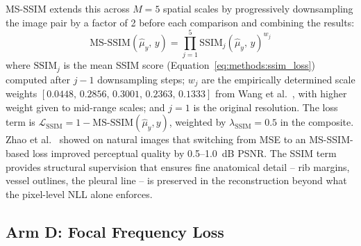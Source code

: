 \documentclass[12pt, a4paper, twoside, openright]{book}
\begin{document}
MS-SSIM \cite{wang_multiscale_2003} extends this across $M = 5$ spatial scales by
progressively downsampling the image pair by a factor of 2 before each comparison and
combining the results:
\begin{equation}
\label{eq:methods:ssim}
\mathrm{MS\text{-}SSIM}\!\left(\hat{\mu}_y,\,y\right)
  = \prod_{j=1}^{5}\mathrm{SSIM}_j\!\left(\hat{\mu}_y,\,y\right)^{w_j}
\end{equation}
where $\mathrm{SSIM}_j$ is the mean SSIM score (Equation~\ref{eq:methods:ssim_loss})
computed after $j-1$ downsampling steps; $w_j$ are the empirically determined scale
weights $[0.0448,\,0.2856,\,0.3001,\,0.2363,\,0.1333]$ from Wang et al.\
\cite{wang_multiscale_2003}, with higher weight given to mid-range scales; and $j = 1$
is the original resolution. The loss term is $\mathcal{L}_{\mathrm{SSIM}} = 1 -
\mathrm{MS\text{-}SSIM}(\hat{\mu}_y, y)$, weighted by $\lambda_{\mathrm{SSIM}} = 0.5$
in the composite. Zhao et al.\ \cite{zhao_loss_2017} showed on natural images that
switching from MSE to an MS-SSIM-based loss improved perceptual quality by 0.5--1.0~dB
PSNR. The SSIM term provides structural supervision that ensures fine anatomical
detail -- rib margins, vessel outlines, the pleural line -- is preserved in the
reconstruction beyond what the pixel-level NLL alone enforces.

\subsection{Arm D: Focal Frequency Loss}
\label{sec:methods:loss:ffl}
\end{document}
